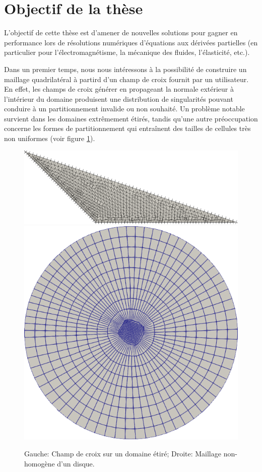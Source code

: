 \section{Objectif de la thèse}


L'objectif de cette thèse est d'amener de nouvelles solutions pour gagner en performance lors de résolutions numériques d'équations aux dérivées partielles (en particulier pour l'électromagnétisme, la mécanique des fluides, l'élasticité, etc.).

Dans un premier temps, nous nous intéressons à la possibilité de construire un maillage quadrilatéral à partird d'un champ de croix fournit par un utilisateur. En effet, les champs de croix générer en propageant la normale extérieur à l'intérieur du domaine \cite{kowalski2013pde} produisent une distribution de singularités pouvant conduire à un partitionnement invalide ou non souhaité. Un problème notable survient dans les domaines extrêmement étirés, tandis qu'une autre préoccupation concerne les formes de partitionnement qui entraînent des tailles de cellules très non uniformes (voir figure \ref{fig:dom_etire_mesh_inhomogene}).

\begin{figure}[!h]
    \centering
    \includegraphics[scale=0.18]{images/stretch.pdf}
    \includegraphics[scale=0.22]{images/new_cercle.png}
    \caption{Gauche: Champ de croix sur un domaine étiré; Droite: Maillage non-homogène d'un disque.}
    \label{fig:dom_etire_mesh_inhomogene}
\end{figure}

